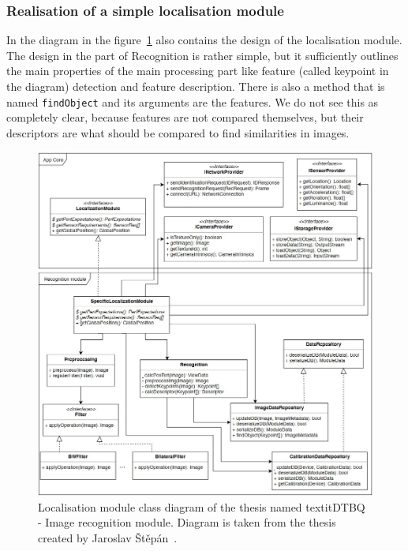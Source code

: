 \documentclass[thesis=B,english]{FITthesis}[2019/12/23]
\begin{document}
                \subsubsection*{Realisation of a simple localisation module}
                In the diagram in the figure~\ref{fig:Jaroslav_Stepan_localisation_module} also contains the design of the localisation module. The design in the part of Recognition is rather simple, but it sufficiently outlines the main properties of the main processing part like feature (called keypoint in the diagram) detection and feature description. There is also a method that is named \texttt{findObject} and its arguments are the features. We do not see this as completely clear, because features are not compared themselves, but their descriptors are what should be compared to find similarities in images.
                
                
                \begin{figure}
                    \centering
                    \includegraphics[width = 1\linewidth] {pictures/Jaroslav_Stepan_localisation_module.jpg}
                    \caption[Localisation module class diagram of the thesis named \textit{DTBQ - Image recognition module}]{Localisation module class diagram of the thesis named textit{DTBQ - Image recognition module}. Diagram is taken from the thesis created by Jaroslav Štěpán~\cite{Stepan2019}.}
                    \label{fig:Jaroslav_Stepan_localisation_module}
                \end{figure}
                
\end{document}
